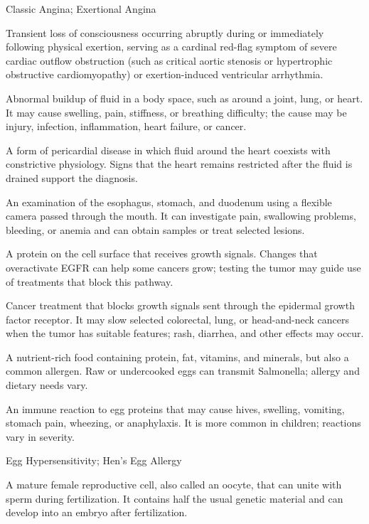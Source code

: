 \synonyms
Classic Angina; Exertional Angina

 Transient loss of consciousness occurring abruptly during or immediately following physical exertion, serving as a cardinal red-flag symptom of severe cardiac outflow obstruction (such as critical aortic stenosis or hypertrophic obstructive cardiomyopathy) or exertion-induced ventricular arrhythmia.

 Abnormal buildup of fluid in a body space, such as around a joint, lung, or heart. It may cause swelling, pain, stiffness, or breathing difficulty; the cause may be injury, infection, inflammation, heart failure, or cancer.

 A form of pericardial disease in which fluid around the heart coexists with constrictive physiology. Signs that the heart remains restricted after the fluid is drained support the diagnosis.

 An examination of the esophagus, stomach, and duodenum using a flexible camera passed through the mouth. It can investigate pain, swallowing problems, bleeding, or anemia and can obtain samples or treat selected lesions.

 A protein on the cell surface that receives growth signals. Changes that overactivate EGFR can help some cancers grow; testing the tumor may guide use of treatments that block this pathway.

 Cancer treatment that blocks growth signals sent through the epidermal growth factor receptor. It may slow selected colorectal, lung, or head-and-neck cancers when the tumor has suitable features; rash, diarrhea, and other effects may occur.

 A nutrient-rich food containing protein, fat, vitamins, and minerals, but also a common allergen. Raw or undercooked eggs can transmit Salmonella; allergy and dietary needs vary.

 An immune reaction to egg proteins that may cause hives, swelling, vomiting, stomach pain, wheezing, or anaphylaxis. It is more common in children; reactions vary in severity.

\synonyms
Egg Hypersensitivity; Hen's Egg Allergy

 A mature female reproductive cell, also called an oocyte, that can unite with sperm during fertilization. It contains half the usual genetic material and can develop into an embryo after fertilization.


